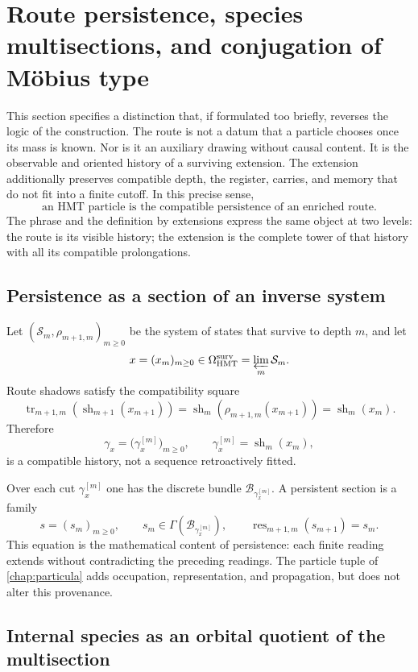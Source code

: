 \section{Route persistence, species multisections, and conjugation of Möbius type}
\label{sec:persistencia-ruta-mobius-familias}

This section specifies a distinction that, if formulated too
briefly, reverses the logic of the construction. The route is not a datum that
a particle chooses once its mass is known. Nor is it an auxiliary drawing
without causal content. It is the observable and oriented history of a surviving extension.
The extension additionally preserves compatible depth, the
register, carries, and memory that do not fit into a finite cutoff. In this
precise sense,
\[
 \boxed{\text{an HMT particle is the compatible persistence of an
 enriched route}.}
\]
The phrase and the definition by extensions express the same object at two
levels: the route is its visible history; the extension is the complete tower of
that history with all its compatible prolongations.

\subsection{Persistence as a section of an inverse system}

Let \((\mathcal S_m,\rho_{m+1,m})_{m\geq0}\) be the system of states that
survive to depth \(m\), and let
\[
 x=(x_m)_{m\geq0}\in\Omega_{\rm HMT}^{\rm surv}
 =\varprojlim_m\mathcal S_m.
\]
Route shadows satisfy the compatibility square
\[
 \operatorname{tr}_{m+1,m}\!\left(\operatorname{sh}_{m+1}(x_{m+1})\right)
 =\operatorname{sh}_{m}\!\left(\rho_{m+1,m}(x_{m+1})\right)
 =\operatorname{sh}_{m}(x_m).
\]
Therefore
\[
 \gamma_x=\bigl(\gamma_x^{[m]}\bigr)_{m\geq0},
 \qquad \gamma_x^{[m]}=\operatorname{sh}_m(x_m),
\]
is a compatible history, not a sequence retroactively fitted.

Over each cut \(\gamma_x^{[m]}\) one has the discrete bundle
\(\mathcal B_{\gamma_x^{[m]}}\). A persistent section is a family
\[
 s=(s_m)_{m\geq0},
 \qquad
 s_m\in\Gamma\!\left(\mathcal B_{\gamma_x^{[m]}}\right),
 \qquad
 \operatorname{res}_{m+1,m}(s_{m+1})=s_m.
\]
This equation is the mathematical content of persistence: each finite reading
extends without contradicting the preceding readings. The
particle tuple of \cref{chap:particula} adds occupation,
representation, and propagation, but does not alter this provenance.

\subsection{Internal species as an orbital quotient of the multisection}

